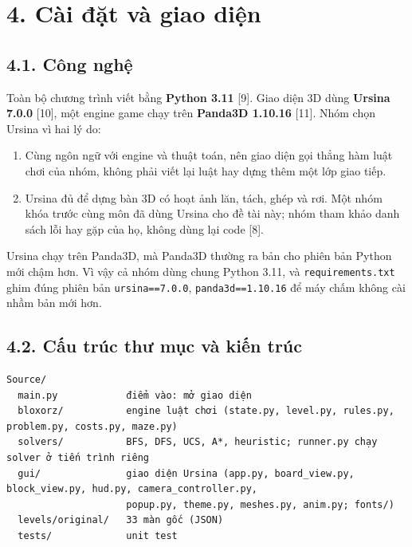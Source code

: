 \section{4. Cài đặt và giao diện}

\subsection{4.1. Công nghệ}

Toàn bộ chương trình viết bằng \textbf{Python 3.11} {[}9{]}. Giao diện 3D dùng \textbf{Ursina 7.0.0} {[}10{]}, một engine game chạy trên \textbf{Panda3D 1.10.16} {[}11{]}. Nhóm chọn Ursina vì hai lý do:

\begin{enumerate}
\def\labelenumi{\arabic{enumi}.}
\tightlist
\item
  Cùng ngôn ngữ với engine và thuật toán, nên giao diện gọi thẳng hàm luật chơi của nhóm, không phải viết lại luật hay dựng thêm một lớp giao tiếp.
\item
  Ursina đủ để dựng bàn 3D có hoạt ảnh lăn, tách, ghép và rơi. Một nhóm khóa trước cùng môn đã dùng Ursina cho đề tài này; nhóm tham khảo danh sách lỗi hay gặp của họ, không dùng lại code {[}8{]}.
\end{enumerate}

Ursina chạy trên Panda3D, mà Panda3D thường ra bản cho phiên bản Python mới chậm hơn. Vì vậy cả nhóm dùng chung Python 3.11, và \texttt{requirements.\allowbreak{}txt} ghim đúng phiên bản \texttt{ursina==7.\allowbreak{}0.\allowbreak{}0}, \texttt{panda3d==1.\allowbreak{}10.\allowbreak{}16} để máy chấm không cài nhầm bản mới hơn.

\subsection{4.2. Cấu trúc thư mục và kiến trúc}

\begin{verbatim}
Source/
  main.py            điểm vào: mở giao diện
  bloxorz/           engine luật chơi (state.py, level.py, rules.py, problem.py, costs.py, maze.py)
  solvers/           BFS, DFS, UCS, A*, heuristic; runner.py chạy solver ở tiến trình riêng
  gui/               giao diện Ursina (app.py, board_view.py, block_view.py, hud.py, camera_controller.py,
                     popup.py, theme.py, meshes.py, anim.py; fonts/)
  levels/original/   33 màn gốc (JSON)
  tests/             unit test
\end{verbatim}

